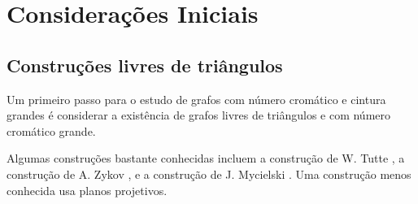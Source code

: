 \chapter{Considerações Iniciais}
\label{cap:consiniciais}

\section{Construções livres de triângulos}


Um primeiro passo para o estudo de grafos com número cromático e cintura grandes é considerar a existência de grafos livres de triângulos e com número cromático grande. 

Algumas construções bastante conhecidas incluem a construção de W. Tutte \cite{descartes1947three}, a construção de A. Zykov \cite{zykov1949some}, e a construção de J. Mycielski \cite{mycielski1955coloriage}. Uma construção menos conhecida usa planos projetivos.





    
